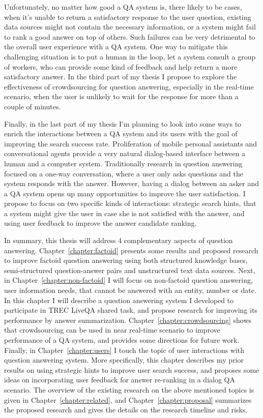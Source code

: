 Unfortunately, no matter how good a QA system is, there likely to be cases, when it's unable to return a satisfactory response to the user question, \eg existing data sources might not contain the necessary information, or a system might fail to rank a good answer on top of others.
Such failures can be very detrimental to the overall user experience with a QA system.
One way to mitigate this challenging situation is to put a human in the loop, \eg let a system consult a group of workers, who can provide some kind of feedback and help return a more satisfactory answer.
In the third part of my thesis I propose to explore the effectiveness of crowdsourcing for question answering, especially in the real-time scenario, when the user is unlikely to wait for the response for more than a couple of minutes.

Finally, in the last part of my thesis I'm planning to look into some ways to enrich the interactions between a QA system and its users with the goal of improving the search success rate.
Proliferation of mobile personal assistants and conversational agents provide a very natural dialog-based interface between a human and a computer system.
Traditionally research in question answering focused on a one-way conversation, where a user only asks questions and the system responds with the answer.
However, having a dialog between an asker and a QA system opens up many opportunities to improve the user satisfaction.
I propose to focus on two specific kinds of interactions: strategic search hints, that a system might give the user in case she is not satisfied with the answer, and using user feedback to improve the answer candidate ranking.

In summary, this thesis will address 4 complementary aspects of question answering.
Chapter~\ref{chapter:factoid} presents some results and proposed research to improve factoid question answering using both structured knowledge bases, semi-structured question-answer pairs and unstructured text data sources.
Next, in Chapter~\ref{chapter:non-factoid} I will focus on non-factoid question answering, \ie user information needs, that cannot be answered with an entity, number or date.
In this chapter I will describe a question answering system I developed to participate in TREC LiveQA shared task, and propose research for improving its performance by answer summarization.
Chapter~\ref{chapter:crowdsourcing} shows that crowdsourcing can be used in near real-time scenario to improve performance of a QA system, and provides some directions for future work.
Finally, in Chapter~\ref{chapter:users} I touch the topic of user interactions with question answering system.
More specifically, this chapter describes my prior results on using strategic hints to improve user search success, and proposes some ideas on incorporating user feedback for answer re-ranking in a dialog QA scenario.
The overview of the existing research on the above mentioned topics is given in Chapter~\ref{chapter:related}, and Chapter~\ref{chapter:proposal} summarizes the proposed research and gives the details on the research timeline and risks.

